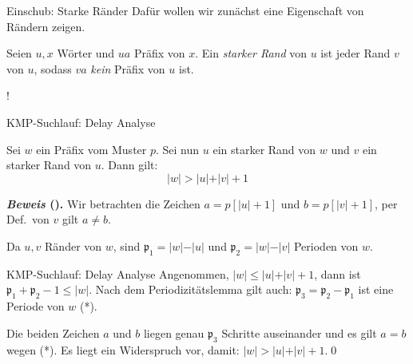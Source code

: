 \documentclass[xcolor=dvipsnames, aspectratio=169]{beamer}
\begin{document}
\begin{frame}{Einschub: Starke Ränder}
Dafür wollen wir zunächst eine Eigenschaft von Rändern zeigen.\medskip

\begin{defi}
Seien $u,x$ Wörter und $ua$ Präfix von $x$. Ein \emph{starker Rand} von $u$ ist jeder Rand $v$ von $u$, sodass $va$ \emph{kein} Präfix von $u$ ist.
\end{defi}
\pause\bigskip

\begin{center}
 {!} {
}
\end{center}
\end{frame}

\begin{frame}{KMP-Suchlauf: Delay Analyse}
\begin{lemm}\label{lem:stark}
Sei $w$ ein Präfix vom Muster $p$. Sei nun $u$ ein starker Rand von $w$ und $v$ ein starker Rand von $u$. Dann gilt: \[\vert w\vert > \vert u\vert +\vert v\vert +1\]
\end{lemm}\bigskip

\textbf{\textit{Beweis} (\cite{purdue}).} Wir betrachten die Zeichen $a=p[\vert u\vert+1]$ und $b=p[\vert v\vert+1]$, per Def.\ von $v$ gilt $a\neq b$.\medskip

Da $u,v$ Ränder von $w$, sind $\mathfrak{p}_1=\vert w\vert -\vert u\vert$ und $\mathfrak{p}_2=\vert w\vert -\vert v\vert$ Perioden von $w$.
\end{frame}\medskip

\begin{frame}{KMP-Suchlauf: Delay Analyse}
Angenommen, $\vert w\vert \leq \vert u\vert+\vert v\vert +1$, dann ist $\mathfrak{p}_1+\mathfrak{p}_2-1\leq \vert w\vert$. Nach dem Periodizitätslemma gilt auch: $\mathfrak{p}_3=\mathfrak{p}_2-\mathfrak{p}_1$ ist eine Periode von $w$ (*).\medskip

Die beiden Zeichen $a$ und $b$ liegen genau $\mathfrak{p}_3$ Schritte auseinander und es gilt $a=b$ wegen (*). Es liegt ein Widerspruch vor, damit: $\vert w\vert > \vert u\vert +\vert v\vert +1$.\qed
\end{frame}
\end{document}
